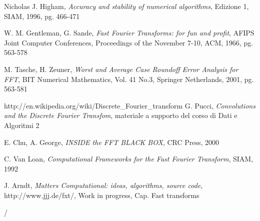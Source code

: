 \begin{thebibliography}{99}
 Nicholas J. Higham, \emph{Accuracy and stability of numerical algorithms}, Edizione 1, SIAM, 1996, pg. 466-471

 W. M. Gentleman, G. Sande, \emph{Fast Fourier Transforms: for fun and profit}, AFIPS Joint Computer Conferences, Proceedings of the November 7-10, ACM, 1966, pg. 563-578

M. Tasche, H. Zeuner, \emph{Worst and Average Case Roundoff Error Analysis for FFT}, BIT Numerical Mathematics, Vol. 41 No.3, Springer Netherlands, 2001, pg. 563-581

 http://en.wikipedia.org/wiki/Discrete\_Fourier\_transform
G. Pucci, \emph{Convolutions and the Discrete Fourier Transfom}, materiale a supporto del corso di Dati e Algoritmi 2

 E. Chu, A. George, \emph{INSIDE the FFT BLACK BOX}, CRC Press, 2000

 C. Van Loan, \emph{Computational Frameworks for the Fast Fourier Transform}, SIAM, 1992

 J. Arndt, \emph{Matters Computational: ideas, algorithms, source code}, http://www.jjj.de/fxt/, Work in progress, Cap. Fast transforms





\end{thebibliography}

 / 